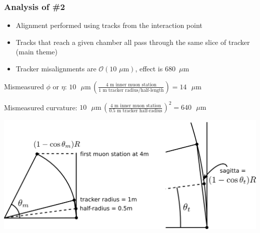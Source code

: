 \documentclass[compress]{beamer}
\begin{document}
\begin{frame}
\frametitle{Analysis of \#2}
\small

\begin{itemize}
\item Alignment performed using tracks from the interaction point
\item Tracks that reach a given chamber all pass through the same slice of tracker (main theme)
\item Tracker misalignments are $\mathcal{O}(\mbox{10 $\mu$m})$, effect is 680~$\mu$m
\end{itemize}

Mismeasured $\phi$ or $\eta$: \hfill $\displaystyle 10\mbox{ $\mu$m}\, \left(\frac{\mbox{4 m inner muon station}}{\mbox{1 m tracker radius/half-length}}\right) = 14\mbox{ $\mu$m}$

\vspace{0.2 cm}
Mismeasured curvature: \hfill $\displaystyle 10\mbox{ $\mu$m}\, \left(\frac{\mbox{4 m inner muon station}}{\mbox{0.5 m tracker half-radius}}\right)^2 = 640\mbox{ $\mu$m}$

\begin{center}
\includegraphics[width=0.7\linewidth]{curvature_extrapolation.png}
\end{center}
\end{frame}
\end{document}
